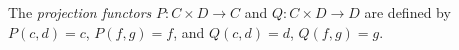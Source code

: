 The \emph{projection functors} $P: C \times D \to C$ and $Q: C \times D \to D$ are defined by $P(c, d) = c$, $P(f, g) = f$, and $Q(c, d) = d$, $Q(f, g) = g$.

